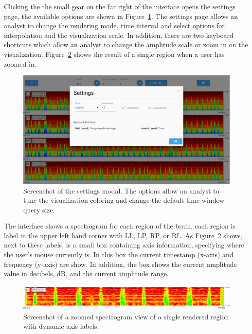 Clicking the the small gear on the far right of the interface opens the
settings page, the available options are shown in Figure~\ref{fig:settings}.
The settings page allows an analyst to change the rendering mode, time interval
and select options for interpolation and the visualization scale. In addition,
there are two keyboard shortcuts which allow an analyst to change the amplitude
scale or zoom in on the visualization. Figure~\ref{fig:zoomed-region} shows the
result of a single region when a user has zoomed in. \\

\begin{figure}[h]
\begin{center}
\includegraphics[scale=0.35]{./img/settings.png}
\caption{Screenshot of the settings modal. The options allow an analyst to tune
  the visualization coloring and change the default time window query size.}
\label{fig:settings}
\end{center}
\end{figure}

The interface shows a spectrogram for each region of the brain, each region is
label in the upper left hand corner with \c{LL}, \c{LP}, \c{RP}, or \c{RL}.  As
Figure~\ref{fig:zoomed-region} shows, next to these labels, is a small box
containing axis information, specifying where the user's mouse currently is. In
this box the current timestamp (x-axis) and frequency (y-axis) are show. In
addition, the box shows the current amplitude value in decibels, dB, and the
current amplitude range. \\

\begin{figure}[h]
\begin{center}
\includegraphics[scale=0.35]{./img/zoomed-region.png}
\caption{Screenshot of a zoomed spectrogram view of a single rendered region
  with dynamic axis labels.}
\label{fig:zoomed-region}
\end{center}
\end{figure}

